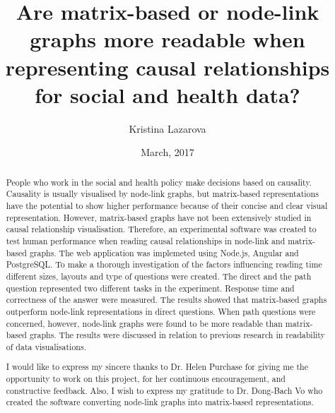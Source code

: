 \documentclass{l4proj}
\begin{document}
\title{Are matrix-based or node-link graphs more readable when representing causal relationships for social and health data?}
\author{Kristina Lazarova}
\date{March, 2017}
\maketitle


\begin{abstract}

People who work in the social and health policy make decisions based on causality. Causality is usually visualised by node-link graphs, but matrix-based representations have the potential to show higher performance because of their concise and clear visual representation. However, matrix-based graphs have not been extensively studied in causal relationship visualisation. Therefore, an experimental software was created to test human performance when reading causal relationships in node-link and matrix-based graphs. The web application was implemeted using Node.js, Angular and PostgreSQL. To make a thorough investigation of the factors influencing reading time different sizes, layouts and type of questions were created. The direct and the path question represented two different tasks in the experiment. Response time and correctness of the answer were measured. The results showed that matrix-based graphs outperform node-link representations in direct questions. When path questions were concerned, however, node-link graphs were found to be more readable than matrix-based graphs. The results were discussed in relation to previous research in readability of data visualisations.

\end{abstract}


\renewcommand{\abstractname}{Acknowledgements}
\begin{abstract}
I would like to express my sincere thanks to Dr. Helen Purchase for giving me the opportunity to work on this project, for her continuous encouragement, and constructive feedback. Also, I wish to express my gratitude to Dr. Dong-Bach Vo who created the software converting node-link graphs into matrix-based representations. 

\end{abstract}


\educationalconsent
%
%
\tableofcontents
\end{document}
